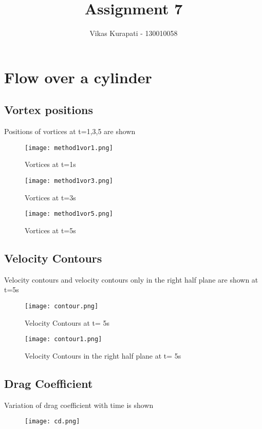 \documentclass[11pt, a4paper]{article}
\title{\textbf{Assignment 7}}
\author{Vikas Kurapati - 130010058}
\begin{document}
\maketitle
\newpage
\section{Flow over a cylinder}
\subsection{Vortex positions}
Positions of vortices at t=1,3,5 are shown 
\begin{figure}[H]
\centering
\texttt{[image: method1vor1.png]}
\caption{Vortices at t=1s}
\end{figure}
\begin{figure}[H]
\centering
\texttt{[image: method1vor3.png]}
\caption{Vortices at t=3s}
\end{figure}
\begin{figure}[H]
\centering
\texttt{[image: method1vor5.png]}
\caption{Vortices at t=5s}
\end{figure}
\subsection{Velocity Contours}
Velocity contours and velocity contours only in the right half plane are shown at t=5s
\begin{figure}[H]
\texttt{[image: contour.png]}
\caption{Velocity Contours at t= 5s}
\end{figure}
\begin{figure}[H]
\texttt{[image: contour1.png]}
\caption{Velocity Contours in the right half plane at t= 5s}
\end{figure}
\subsection{Drag Coefficient}
Variation of drag coefficient with time is shown
\begin{figure}[H]
\texttt{[image: cd.png]}
\end{figure}
\end{document}
